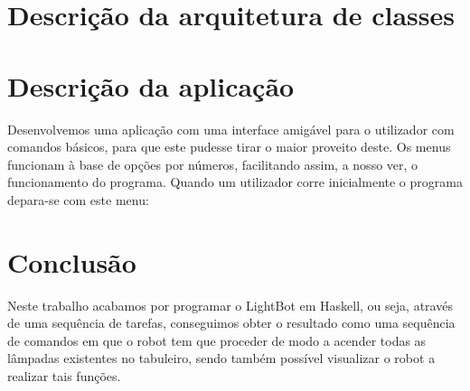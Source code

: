 \documentclass[12pt,a4paper]{report}
\begin{document}
\chapter{Descrição da arquitetura de classes}

\chapter{Descrição da aplicação}

Desenvolvemos uma aplicação com uma interface amigável para o utilizador com comandos básicos, para que este pudesse tirar o maior proveito deste. Os menus funcionam à base de opções por números, facilitando assim, a nosso ver, o funcionamento do programa. 
Quando um utilizador corre inicialmente o programa depara-se com este menu:

\chapter{Conclusão}

Neste trabalho acabamos por programar o LightBot em Haskell, ou seja, através de uma sequência de tarefas, conseguimos obter o resultado como uma sequência de comandos em que o robot tem que proceder de modo a acender todas as lâmpadas existentes no tabuleiro, sendo também possível visualizar o robot a realizar tais funções.
\end{document}
